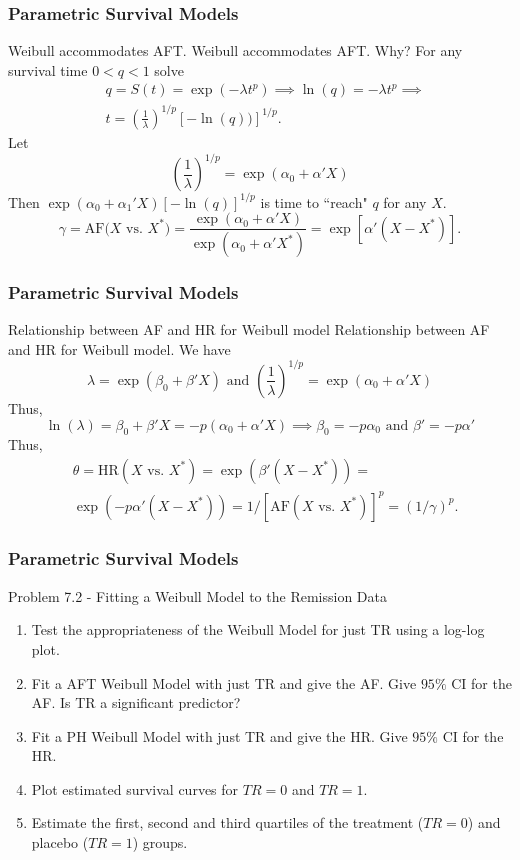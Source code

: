 \documentclass{beamer}
\theoremstyle{definition}
\begin{document}
\begin{frame}
\frametitle{Parametric Survival Models}
\begin{block}{Weibull accommodates AFT.}
Weibull accommodates AFT. Why? For any survival time $0 < q < 1$ solve
\begin{align*}
& q = S(t) =  \exp(-\lambda t^p) \implies \ln(q) = - \lambda t^p \implies \\
& t = \left(\frac{1}{\lambda}\right)^{1/p} [- \ln(q))]^{1/p}.
\end{align*}
Let
\[
\left(\frac{1}{\lambda}\right)^{1/p} = \exp(\alpha_0 + \alpha'X)
\]
Then $\exp(\alpha_0 + \alpha_1'X)[- \ln(q)]^{1/p}$ is time to ``reach" $q$ for any $X$. 
\vspace{-10pt}
\[
\gamma = \text{AF($X$ vs. $X^*$)} = \frac{\exp(\alpha_0 + \alpha'X)}{\exp(\alpha_0 + \alpha'X^*)} = \exp[\alpha'(X-X^*)].
\]
\end{block}
\end{frame}

\begin{frame}
\frametitle{Parametric Survival Models}
\begin{block}{Relationship between AF and HR for Weibull model}
Relationship between AF and HR for Weibull model. We have
\[
\lambda = \exp(\beta_0 + \beta'X) \text{ and } \left(\frac{1}{\lambda}\right)^{1/p} = \exp(\alpha_0 + \alpha'X)
\]
Thus,
\[ \ln(\lambda) = \beta_0 + \beta'X = -p(\alpha_0 + \alpha'X) \implies \beta_0 = -p\alpha_0 \text{ and } \beta'=-p\alpha' \]
Thus,
\begin{align*}
&\theta = \text{HR}(X \text{ vs. } X^*) = \exp(\beta'(X - X^*)) =\\
&\exp(-p\alpha'(X - X^*)) = 1/[\text{AF}(X \text{ vs. } X^*)]^p = (1/\gamma)^p. 
\end{align*}
\end{block}
\end{frame}

\begin{frame} 
\frametitle{Parametric Survival Models} 
\begin{block}{Problem 7.2 - Fitting a Weibull Model to the Remission Data} 
\begin{enumerate}
\item Test the appropriateness of the Weibull Model for just TR using a log-log plot. 
\item Fit a AFT Weibull Model with just TR and give the AF. Give $95\%$ CI for the AF. Is TR a significant predictor? 
\item Fit a PH  Weibull Model with just TR and give the HR. Give $95\%$ CI for the HR.
\item Plot estimated survival curves for $TR=0$ and $TR=1$. 
\item Estimate the first, second and third quartiles of the treatment ($TR=0$) and placebo ($TR=1$) groups. 
\end{enumerate} 
\end{block} 
\end{frame} 
\end{document}
